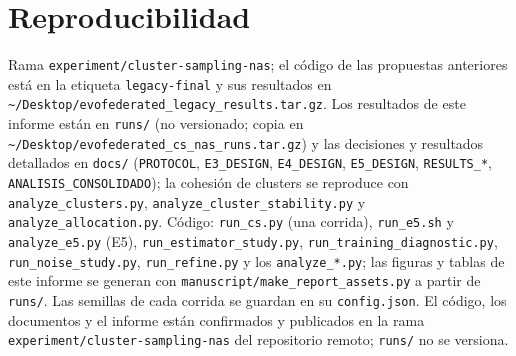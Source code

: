 \documentclass[11pt,a4paper]{article}
\begin{document}
\section{Reproducibilidad}
Rama \texttt{experiment/cluster-sampling-nas}; el código de las propuestas anteriores está en la etiqueta \texttt{legacy-final} y sus resultados en \texttt{\~{}/Desktop/evofederated\_legacy\_results.tar.gz}. Los resultados de este informe están en \texttt{runs/} (no versionado; copia en \texttt{\~{}/Desktop/evofederated\_cs\_nas\_runs.tar.gz}) y las decisiones y resultados detallados en \texttt{docs/} (\texttt{PROTOCOL}, \texttt{E3\_DESIGN}, \texttt{E4\_DESIGN}, \texttt{E5\_DESIGN}, \texttt{RESULTS\_*}, \texttt{ANALISIS\_CONSOLIDADO}); la cohesión de clusters se reproduce con \texttt{analyze\_clusters.py}, \texttt{analyze\_cluster\_stability.py} y \texttt{analyze\_allocation.py}. Código: \texttt{run\_cs.py} (una corrida), \texttt{run\_e5.sh} y \texttt{analyze\_e5.py} (E5), \texttt{run\_estimator\_study.py}, \texttt{run\_training\_diagnostic.py}, \texttt{run\_noise\_study.py}, \texttt{run\_refine.py} y los \texttt{analyze\_*.py}; las figuras y tablas de este informe se generan con \texttt{manuscript/make\_report\_assets.py} a partir de \texttt{runs/}. Las semillas de cada corrida se guardan en su \texttt{config.json}. El código, los documentos y el informe están confirmados y publicados en la rama \texttt{experiment/cluster-sampling-nas} del repositorio remoto; \texttt{runs/} no se versiona.



\end{document}
